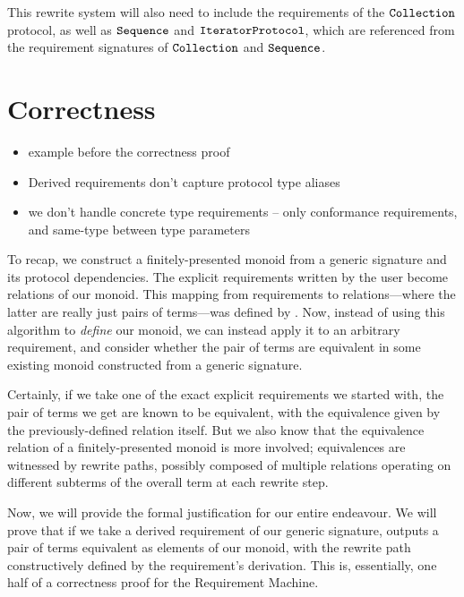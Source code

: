 \documentclass[../generics]{subfiles}
\begin{document}
This rewrite system will also need to include the requirements of the $\texttt{Collection}$ protocol, as well as $\texttt{Sequence}$ and $\texttt{IteratorProtocol}$, which are referenced from the requirement signatures of $\texttt{Collection}$ and $\texttt{Sequence}$.

\section{Correctness}\label{rqm correctness}

\begin{itemize}
\item example before the correctness proof
\item Derived requirements don’t capture protocol type aliases
\item we don't handle concrete type requirements -- only conformance requirements, and same-type between type parameters
\end{itemize}

To recap, we construct a finitely-presented monoid from a generic signature and its protocol dependencies. The explicit requirements written by the user become relations of our monoid. This mapping from requirements to relations---where the latter are really just pairs of terms---was defined by . Now, instead of using this algorithm to \emph{define} our monoid, we can instead apply it to an arbitrary requirement, and consider whether the pair of terms are equivalent in some existing monoid constructed from a generic signature.

Certainly, if we take one of the exact explicit requirements we started with, the pair of terms we get are known to be equivalent, with the equivalence given by the previously-defined relation itself. But we also know that the equivalence relation of a finitely-presented monoid is more involved; equivalences are witnessed by rewrite paths, possibly composed of multiple relations operating on different subterms of the overall term at each rewrite step.

Now, we will provide the formal justification for our entire endeavour. We will prove that if we take a derived requirement of our generic signature,  outputs a pair of terms equivalent as elements of our monoid, with the rewrite path constructively defined by the requirement's derivation. This is, essentially, one half of a correctness proof for the Requirement Machine.
\end{document}
